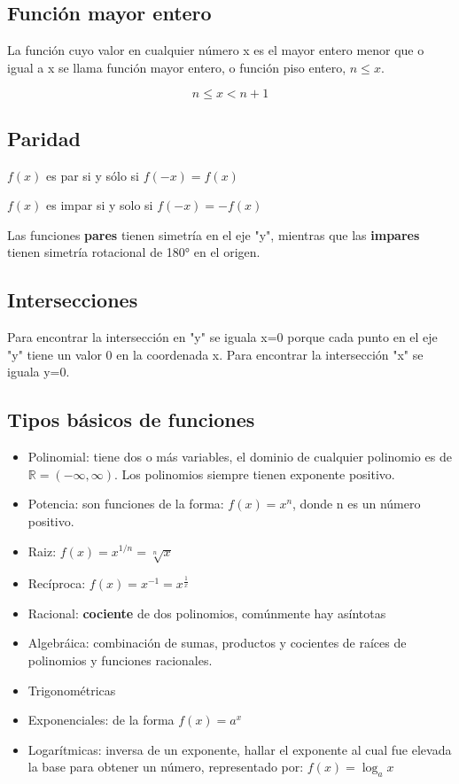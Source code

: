 \documentclass[letterpaper,12pt]{article}
\begin{document}
\begin{sloppypar}
\subsection{Función mayor entero}
La función cuyo valor en cualquier número x es el mayor entero menor que o igual a x se llama función mayor entero, o función piso entero, $n \leq x$.

$$n\leq x< n+1$$



\subsection{Paridad}

\begin{center}
    $f(x)$ es par si y sólo si $f(-x) = f(x)$
    
    $f(x)$ es impar si y solo si $f(-x) = -f(x)$ 
\end{center}

Las funciones \textbf{pares} tienen simetría en el eje "y", mientras que las \textbf{impares} tienen simetría rotacional de 180° en el origen. 

\subsection{Intersecciones}
Para encontrar la intersección en "y" se iguala x=0 porque cada punto en el eje "y" tiene un valor 0 en la coordenada x.
Para encontrar la intersección "x" se iguala y=0.

\subsection{Tipos básicos de funciones}
\begin{itemize}
    \item Polinomial: tiene dos o más variables, el dominio de cualquier polinomio es de $\mathbb{R} = (-\infty, \infty)$. Los polinomios siempre tienen exponente positivo.
    \item Potencia: son funciones de la forma: $f(x) = x^{n}$, donde n es un número positivo.
    \item Raiz: $ f(x) = x^{1/n} = \sqrt[n]{x} $
    \item Recíproca: $ f(x) = x^{-1} = x^{\frac{1}{x}}$
    \item Racional: \textbf{cociente} de dos polinomios, comúnmente hay asíntotas
    \item Algebráica: combinación de sumas, productos y cocientes de raíces de polinomios y funciones racionales.
    \item Trigonométricas 
    \item Exponenciales: de la forma $f(x) = a^{x}$
    \item Logarítmicas: inversa de un exponente, hallar el exponente al cual fue elevada la base para obtener un número, representado por: $f(x) = \log_a{x}$
\end{itemize}


\end{sloppypar}
\end{document}
